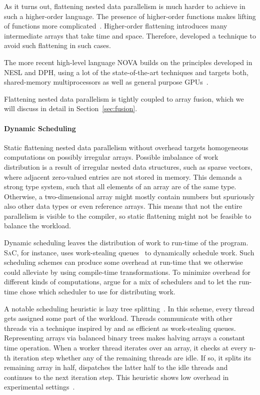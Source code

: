 \documentclass[a4paper]{article}
\newcommand{\sac}{S\textsc{a}C}
\begin{document}
As it turns out, flattening nested data parallelism is much harder to
achieve in such a higher-order language. The presence of higher-order
functions makes lifting of functions more
complicated~\cite{Lippmeier:2012:WEH:2364527.2364564}. Higher-order
flattening introduces many intermediate arrays that take time and
space. Therefore, \citet{Keller:2012:VA:2364506.2364512} developed a
technique to avoid such flattening in such cases.

The more recent high-level language NOVA builds on the principles
developed in NESL and DPH, using a lot of the state-of-the-art
techniques and targets both, shared-memory multiprocessors as well as
general purpose GPUs~\cite{Collins:2014:NFL:2627373.2627375}.

Flattening nested data parallelism is tightly coupled to array fusion,
which we will discuss in detail in Section~\ref{sec:fusion}.

\paragraph{Dynamic Scheduling}

Static flattening nested data parallelism without overhead targets
homogeneous computations on possibly irregular arrays. Possible
imbalance of work distribution is a result of irregular nested data
structures, such as sparse vectors, where adjacent zero-valued entries
are not stored in memory. This demands a strong type system, such that
all elements of an array are of the same type. Otherwise, a
two-dimensional array might mostly contain numbers but spuriously also
other data types or even reference arrays. This means that not the
entire parallelism is visible to the compiler, so static flattening
might not be feasible to balance the workload.

Dynamic scheduling leaves the distribution of work to run-time of the
program. \sac{}, for instance, uses work-stealing
queues~\cite{Chase2005Dynamic, Grelck:2007:SOS:1248648.1248654} to
dynamically schedule work. Such scheduling schemes can produce some
overhead at run-time that we otherwise could alleviate by using
compile-time transformations. To minimize overhead for different kinds
of computations, \citet{Fluet:2008:SFG:1411204.1411239} argue for a
mix of schedulers and to let the run-time chose which scheduler to use
for distributing work.

A notable scheduling heuristic is lazy tree
splitting~\cite{Bergstrom:2010:LTS:1863543.1863558}. In this scheme,
every thread gets assigned some part of the workload. Threads
communicate with other threads via a technique inspired by and as
efficient as work-stealing queues. Representing arrays via balanced
binary trees makes halving arrays a constant time operation. When a
worker thread iterates over an array, it checks at every n-th
iteration step whether any of the remaining threads are idle. If so,
it splits its remaining array in half, dispatches the latter half to
the idle threads and continues to the next iteration step. This
heuristic shows low overhead in experimental
settings~\cite{Bergstrom:2010:LTS:1863543.1863558}.
\end{document}
